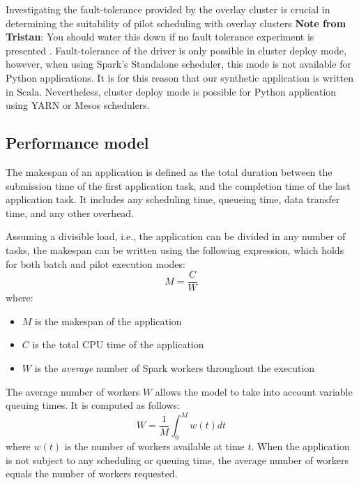 \documentclass{IEEEtran}
\newcommand{\tristan}[1]{\color{red}\textbf{Note from Tristan}:
      #1 \color{black}}
\newcommand{\TG}[1]{\tristan{#1}}
\begin{document}
    Investigating the fault-tolerance provided by the overlay cluster is
    crucial in determining the suitability of pilot scheduling with overlay clusters \TG{You should water this down if 
    no fault tolerance experiment is presented}.
    Fault-tolerance of the driver is only possible in cluster deploy mode, however,
    when using Spark's Standalone scheduler, this mode is not available for Python 
    applications. It is for this reason that our synthetic application is written
    in Scala. Nevertheless, cluster deploy mode is possible for Python application
    using YARN or Mesos schedulers.


    \subsection{Performance model}

    The makespan of an application is defined as the total duration
    between the submission time of the first application task, and the
    completion time of the last application task. It includes any
    scheduling time, queueing time, data transfer time, and any other
    overhead.
    
    Assuming a divisible load, i.e., the application can be divided in any
    number of tasks, the makespan can be written using the following
    expression, which holds for both batch and pilot execution modes:
    \begin{equation}
        M = \frac{C}{W} \label{eq:mcw}
    \end{equation}
    where:
    \begin{itemize}
        \item $M$ is the makespan of the application
        \item $C$ is the total CPU time of the application
        \item $W$ is the \emph{average} number of Spark workers throughout the execution
    \end{itemize}
    The average number of workers $W$ allows the model to take into account
     variable queuing times. It is computed as follows:
    \begin{equation}
        W = \frac{1}{M}\int_0^M{w(t)dt}\label{eq:avgw}
    \end{equation}
    where $w(t)$ is the number of workers available at time $t$. When the
    application is not subject to any scheduling or queuing time, the
    average number of workers equals the number of workers requested. 
\end{document}
